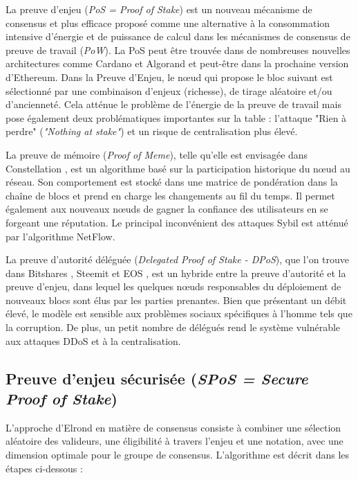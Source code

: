 \documentclass[journal]{IEEEtran}
\begin{document}
La preuve d'enjeu  (\textit{PoS = Proof of Stake}) est un nouveau mécanisme de consensus et plus efficace proposé comme une alternative à la consommation intensive d'énergie et de puissance de calcul dans les mécanismes de consensus de preuve de travail (\textit{PoW}). La PoS peut être trouvée dans de nombreuses nouvelles architectures comme Cardano \cite{19} et Algorand\cite{3} et peut-être dans la prochaine  version d'Ethereum. Dans la Preuve d'Enjeu, le nœud qui propose le bloc suivant est sélectionné par une combinaison d'enjeux (richesse), de tirage aléatoire et/ou d'ancienneté. Cela atténue le problème de l'énergie de la preuve de travail mais pose également deux problématiques importantes sur la table : l'attaque "Rien à perdre" (\textit{"Nothing at stake"}) et un risque de centralisation plus élevé.

La preuve de mémoire (\textit{Proof of Meme}), telle qu'elle est envisagée dans Constellation \cite{20}, est un algorithme basé sur la participation historique du nœud au réseau. Son comportement est stocké dans une matrice de pondération dans la chaîne  de blocs et prend en charge les changements au fil du temps. Il permet également aux nouveaux nœuds de gagner la confiance des utilisateurs en se forgeant une réputation. Le principal inconvénient des attaques Sybil est atténué par l'algorithme NetFlow.

La preuve d'autorité déléguée (\textit{Delegated Proof of Stake - DPoS}), que l'on trouve dans Bitshares \cite{21}, Steemit \cite{22} et EOS \cite{23}, est un hybride entre la preuve d'autorité et la preuve d'enjeu, dans lequel les quelques nœuds responsables du déploiement de nouveaux blocs sont élus par les parties prenantes. Bien que présentant un débit élevé, le modèle est sensible aux problèmes sociaux spécifiques à l'homme tels que la corruption. De plus, un petit nombre de délégués rend le système vulnérable aux attaques DDoS et à la centralisation.

\subsection{Preuve d'enjeu sécurisée (\textit{SPoS = Secure Proof of Stake})}
L'approche d'Elrond en matière de consensus consiste à combiner une sélection aléatoire des valideurs, une éligibilité à travers l'enjeu et une notation, avec une dimension optimale pour le groupe de consensus. L'algorithme est décrit dans les étapes ci-dessous :
\end{document}
